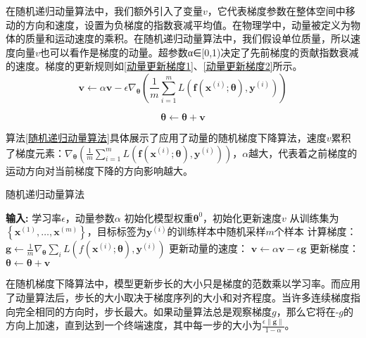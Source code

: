 在随机递归动量算法中，我们额外引入了变量$v$，它代表梯度参数在整体空间中移动的方向和速度，设置为负梯度的指数衰减平均值。在物理学中，动量被定义为物体的质量和运动速度的乘积。在随机递归动量算法中，我们假设单位质量，所以速度向量$v$也可以看作是梯度的动量。超参数α∈[0,1)决定了先前梯度的贡献指数衰减的速度。梯度的更新规则如\ref{动量更新梯度1}、\ref{动量更新梯度2}所示。
\begin{equation}\label{动量更新梯度1}
\boldsymbol{v} \leftarrow \alpha \boldsymbol{v}-\epsilon \nabla_{\boldsymbol{\theta}}\left(\frac{1}{m} \sum_{i=1}^{m} L\left(\boldsymbol{f}\left(\boldsymbol{x}^{(i)} ; \boldsymbol{\theta}\right), \boldsymbol{y}^{(i)}\right)\right)
\end{equation}

\begin{equation}\label{动量更新梯度2}
\boldsymbol{\theta} \leftarrow \boldsymbol{\theta}+\boldsymbol{v}
\end{equation}

算法\ref{随机递归动量算法}具体展示了应用了动量的随机梯度下降算法，速度$v$累积了梯度元素：$\nabla_{\boldsymbol{\theta}}\left(\frac{1}{m} \sum_{i=1}^{m} L\left(\boldsymbol{f}\left(\boldsymbol{x}^{(i)} ; \boldsymbol{\theta}\right), \boldsymbol{y}^{(i)}\right)\right)$，$\alpha$越大，代表着之前梯度的运动方向对当前梯度下降的方向影响越大。

\begin{algorithm}[!htb]
	\caption{随机递归动量算法}
	\label{随机递归动量算法}
	\begin{algorithmic}[1]
		\footnotesize
		\STATE \textbf{输入:} 学习率$\epsilon$，动量参数$\alpha$
		\STATE 初始化模型权重$\boldsymbol{\theta}^{0}$，初始化更新速度$v$
			\STATE 从训练集为$\left\{\boldsymbol{x}^{(1)}, \ldots,\boldsymbol{x}^{(m)}\right\}$，目标标签为$\boldsymbol{y}^{(i)}$的训练样本中随机采样$m$个样本
			\STATE 计算梯度：$\boldsymbol{g} \leftarrow \frac{1}{m} \nabla_{\boldsymbol{\theta}} \sum_{i} L\left(f\left(\boldsymbol{x}^{(i)} ; \boldsymbol{\theta}\right), \boldsymbol{y}^{(i)}\right)$
			\STATE 更新动量的速度： $\boldsymbol{v} \leftarrow \alpha \boldsymbol{v}-\epsilon \boldsymbol{g}$
			\STATE 更新梯度：$\boldsymbol{\theta} \leftarrow \boldsymbol{\theta}+\boldsymbol{v}$
		\ENDWHILE
	\end{algorithmic}
\end{algorithm}

在随机梯度下降算法中，模型更新步长的大小只是梯度的范数乘以学习率。而应用了动量算法后，步长的大小取决于梯度序列的大小和对齐程度。当许多连续梯度指向完全相同的方向时，步长最大。如果动量算法总是观察梯度$g$，那么它将在-$g$的方向上加速，直到达到一个终端速度，其中每一步的大小为$\frac{\epsilon\|\boldsymbol{g}\|}{1-\alpha}$。


